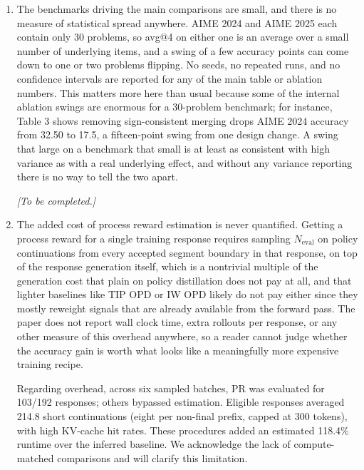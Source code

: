 \documentclass[11pt,a4paper]{article}
\begin{document}
\begin{enumerate}
\item[W2] The benchmarks driving the main comparisons are small, and there is no measure of statistical spread anywhere. AIME 2024 and AIME 2025 each contain only 30 problems, so avg@4 on either one is an average over a small number of underlying items, and a swing of a few accuracy points can come down to one or two problems flipping. No seeds, no repeated runs, and no confidence intervals are reported for any of the main table or ablation numbers. This matters more here than usual because some of the internal ablation swings are enormous for a 30-problem benchmark; for instance, Table 3 shows removing sign-consistent merging drops AIME 2024 accuracy from 32.50 to 17.5, a fifteen-point swing from one design change. A swing that large on a benchmark that small is at least as consistent with high variance as with a real underlying effect, and without any variance reporting there is no way to tell the two apart.
\par{}
\begin{responsebox}[frametitle={Response to W2},nobreak=true]
\textit{[To be completed.]}\par\vspace{1em}
\end{responsebox}

\item[W3] The added cost of process reward estimation is never quantified. Getting a process reward for a single training response requires sampling $N_{\mathrm{eval}}$ on policy continuations from every accepted segment boundary in that response, on top of the response generation itself, which is a nontrivial multiple of the generation cost that plain on policy distillation does not pay at all, and that lighter baselines like TIP OPD or IW OPD likely do not pay either since they mostly reweight signals that are already available from the forward pass. The paper does not report wall clock time, extra rollouts per response, or any other measure of this overhead anywhere, so a reader cannot judge whether the accuracy gain is worth what looks like a meaningfully more expensive training recipe.
\par{}
\begin{responsebox}[frametitle={Response to W3}]
Regarding overhead, across six sampled batches, PR was evaluated for 103/192 responses; others bypassed estimation. Eligible responses averaged 214.8 short continuations (eight per non-final prefix, capped at 300 tokens), with high KV-cache hit rates. These procedures added an estimated 118.4\% runtime over the inferred baseline. We acknowledge the lack of compute-matched comparisons and will clarify this limitation.
\end{responsebox}

\end{enumerate}
\end{document}
